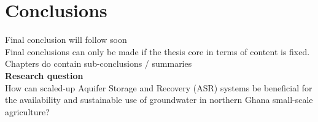 \chapter{Conclusions}

Final conclusion will follow soon \\

Final conclusions can only be made if the thesis core in terms of content is fixed. \\
Chapters do contain sub-conclusions / summaries \\



 

\textbf{Research question}\\

How can scaled-up Aquifer Storage and Recovery (ASR) systems be beneficial for the availability and sustainable use of groundwater in northern Ghana small-scale agriculture? \\
